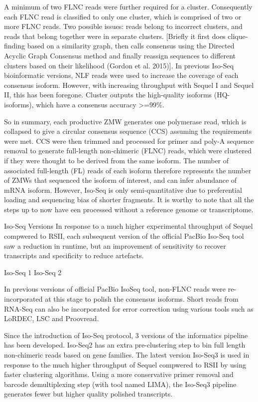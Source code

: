 A minimum of two FLNC reads were further required for a cluster. Consequently each FLNC read is classified to only one cluster, which is comprised of two or more FLNC reads. Two possible issues: reads belong to incorrect clusters, and reads that belong together were in separate clusters. [Briefly it first does clique-finding based on a similarity graph, then calls consensus using the Directed Acyclic Graph Consensus method and finally reassign sequences to different clusters based on their likelihood (Gordon et al. 2015)]. In previous Iso-Seq bioinformatic versions, NLF reads were used to increase the coverage of each consensus isoform. However, with increasing throughput with Sequel I and Sequel II, this has been foregone. Cluster outputs the high-quality isoforms (HQ-isoforms), which have a consensus accuracy >=99\%. 

So in summary, each productive ZMW generates one polymerase read, which is collapsed to give a circular consensus sequence (CCS) assuming the requirements were met. CCS were then trimmed and processed for primer and poly-A sequence removal to generate full-length non-chimeric (FLNC) reads, which were clustered if they were thought to be derived from the same isoform. The number of associated full-length (FL) reads of each isoform therefore represents the number of ZMWs that sequenced the isoform of interest, and can infer abundance of mRNA isoform. However, Iso-Seq is only semi-quantitative due to preferential loading and sequencing bias of shorter fragments. It is worthy to note that all the steps up to now have een processed without a reference genome or transcriptome. 


Iso-Seq Versions 
In response to a much higher experimental throughput of Sequel compwered to RSII, each subsequent   version of the official PacBio Iso-Seq tool saw a reduction in runtime, but an improvement of sensitivity to recover transcripts and specificity to reduce artefacts.

Iso-Seq 1 	
Iso-Seq 2	


In previous versions of official PacBio IsoSeq tool, non-FLNC reads were re-incorporated at this stage to polish the consensus isoforms. Short reads from RNA-Seq can also be incorporated for error correction using various tools such as LoRDEC, LSC and Proovread. 

Since the introduction of Iso-Seq protocol, 3 versions of the informatics pipeline has been developed. Iso-Seq2 has an extra pre-clustering step to bin full length non-chimeric reads based on gene families. The latest version Iso-Seq3 is used in response to the much higher throughput of Sequel compwered to RSII by using faster clustering algorithms. Using a more conservative primer removal and barcode demultiplexing step (with tool named LIMA), the Iso-Seq3 pipeline generates fewer but higher quality polished transcripts. 

